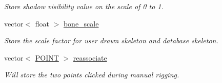 \begin{DoxyCompactItemize}
\begin{DoxyCompactList}\small\item\em \-Store shadow visibility value on the scale of 0 to 1. \end{DoxyCompactList}\item 
\hypertarget{classScribbleArea_a37355b5eb73236f1754d02a9bf715407}{vector$<$ float $>$ \hyperlink{classScribbleArea_a37355b5eb73236f1754d02a9bf715407}{bone\-\_\-scale}}\label{classScribbleArea_a37355b5eb73236f1754d02a9bf715407}

\begin{DoxyCompactList}\small\item\em \-Store the scale factor for user drawn skeleton and database skeleton. \end{DoxyCompactList}\item 
\hypertarget{classScribbleArea_a1af77e24cb9e3bb7cca6484be6995abe}{vector$<$ \hyperlink{structPOINT}{\-P\-O\-I\-N\-T} $>$ \hyperlink{classScribbleArea_a1af77e24cb9e3bb7cca6484be6995abe}{reassociate}}\label{classScribbleArea_a1af77e24cb9e3bb7cca6484be6995abe}

\begin{DoxyCompactList}\small\item\em \-Will store the two points clicked during manual rigging. \end{DoxyCompactList}\end{DoxyCompactItemize}
